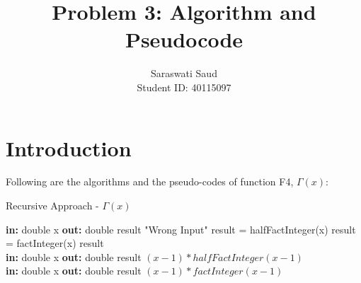\documentclass[12pt]{article}
\title{Problem 3: Algorithm and Pseudocode}
\author{Saraswati Saud \\
Student ID: 40115097}
\date{}
\begin{document}
\maketitle
\section{Introduction}
    Following are the algorithms and the pseudo-codes of function F4, $\Gamma(x)$:
    \begin{algorithm}
    \caption{Recursive Approach - $\Gamma(x)$ }
    \begin{algorithmic}
        \State \textbf{in: } double x
        \State \textbf{out: } double result
            \Return "Wrong Input"
        \Else {}
         \State result = halfFactInteger(x)
            \Else
            \State result = factInteger(x)
            \EndIf
        \State
        \Return result
        \EndIf
    \EndProcedure
    \\
    \State \textbf{in: } double x
    \State \textbf{out: } double result
    \State {}
        \Else
    \State \Return $(x-1) * halfFactInteger(x-1)$
    \EndIf
    \EndProcedure
    \\
    \State \textbf{in: } double x
    \State \textbf{out: } double result
    \State {}
        \Else
    \State \Return $(x-1) * factInteger(x-1)$
    \EndIf
    \EndProcedure
    \\
    \end{algorithmic}
    \end{algorithm}
\end{document}
